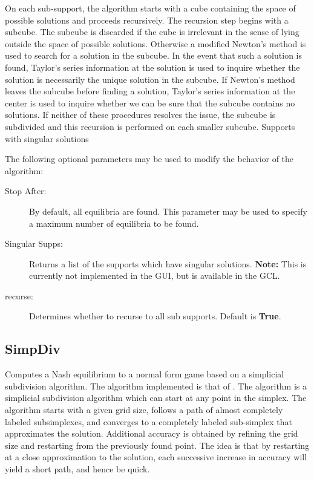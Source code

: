 \documentclass[12pt]{report}
\begin{document}
On each sub-support, the algorithm starts with a cube containing the
space of possible solutions and proceeds recursively.  The recursion
step begins with a subcube.  The subcube is discarded if the cube is
irrelevant in the sense of lying outside the space of possible
solutions.  Otherwise a modified Newton's method is used to search for
a solution in the subcube.  In the event that such a solution is
found, Taylor's series information at the solution is used to inquire
whether the solution is necessarily the unique solution in the
subcube.  If Newton's method leaves the subcube before finding a
solution, Taylor's series information at the center is used to inquire
whether we can be sure that the subcube contains no solutions.  If
neither of these procedures resolves the issue, the subcube is
subdivided and this recursion is performed on each smaller subcube.
Supports with singular solutions 

The following optional parameters may be used to modify the behavior
of the algorithm:

\begin{description}
\item[Stop After:] By default, all equilibria are found.  This
parameter may be used to specify a maximum number of equilibria to be
found.
\item[Singular Supps:] Returns a list of the supports which have
singular solutions. {\bf Note:} This is currently not implemented in
the GUI, but is available in the GCL.
\item[recurse:] Determines whether to recurse to all sub supports.
Default is {\bf True}. 
\end{description}

\subsection{SimpDiv}\label{SimpDiv}
Computes a Nash equilibrium to a normal form game based on a
simplicial subdivision algorithm.  The algorithm implemented is that
of \cite{VTH:1987}.  The algorithm is a simplicial subdivision
algorithm which can start at any point in the simplex.  The algorithm
starts with a given grid size, follows a path of almost completely
labeled subsimplexes, and converges to a completely labeled
sub-simplex that approximates the solution.  Additional accuracy is
obtained by refining the grid size and restarting from the previously
found point.  The idea is that by restarting at a close approximation
to the solution, each successive increase in accuracy will yield a
short path, and hence be quick.
\end{document}
